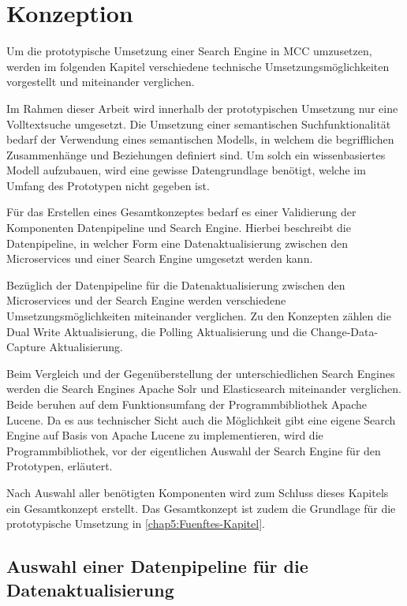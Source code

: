 \chapter{Konzeption\label{chap4:Viertes-Kapitel}}

Um die prototypische Umsetzung einer Search Engine in MCC umzusetzen, werden im folgenden Kapitel verschiedene technische Umsetzungsmöglichkeiten vorgestellt und miteinander verglichen.

Im Rahmen dieser Arbeit wird innerhalb der prototypischen Umsetzung nur eine Volltextsuche umgesetzt. Die Umsetzung einer semantischen Suchfunktionalität bedarf der Verwendung eines semantischen Modells, in welchem die begrifflichen Zusammenhänge und Beziehungen definiert sind. Um solch ein wissenbasiertes Modell aufzubauen, wird eine gewisse Datengrundlage benötigt, welche im Umfang des Prototypen nicht gegeben ist.

Für das Erstellen eines Gesamtkonzeptes bedarf es einer Validierung der Komponenten \glqq Datenpipeline\grqq{} und \glqq Search Engine\grqq{}. Hierbei beschreibt die Datenpipeline, in welcher Form eine Datenaktualisierung zwischen den Microservices und einer Search Engine umgesetzt werden kann.

Bezüglich der Datenpipeline für die Datenaktualisierung zwischen den Microservices und der Search Engine werden verschiedene Umsetzungsmöglichkeiten miteinander verglichen. Zu den Konzepten zählen die \glqq Dual Write Aktualisierung\grqq{}, die \glqq Polling Aktualisierung\grqq{} und die \glqq Change-Data-Capture Aktualisierung\grqq{}.

Beim Vergleich und der Gegenüberstellung der unterschiedlichen Search Engines werden die Search Engines \glqq Apache Solr\grqq{} und \glqq Elasticsearch\grqq{} miteinander verglichen. Beide beruhen auf dem Funktionsumfang der Programmbibliothek \glqq Apache Lucene\grqq{}. Da es aus technischer Sicht auch die Möglichkeit gibt eine eigene Search Engine auf Basis von \glqq Apache Lucene\grqq{} zu implementieren, wird die Programmbibliothek, vor der eigentlichen Auswahl der Search Engine für den Prototypen, erläutert.

Nach Auswahl aller benötigten Komponenten wird zum Schluss dieses Kapitels ein Gesamtkonzept erstellt. Das Gesamtkonzept ist zudem die Grundlage für die prototypische Umsetzung in \autoref{chap5:Fuenftes-Kapitel}.

\section{Auswahl einer Datenpipeline für die Datenaktualisierung\label{sec4.1:Unterpunkt-1}}

